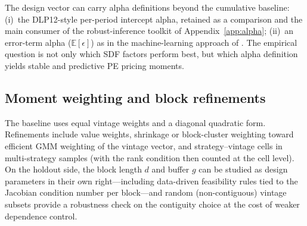 \documentclass[11pt]{article}
\begin{document}
The design vector can carry alpha definitions beyond the cumulative baseline: (i)~the DLP12-style per-period intercept alpha, retained as a comparison and the main consumer of the robust-inference toolkit of Appendix~\ref{app:alpha}; (ii)~an error-term alpha (\(\mathbb E[\epsilon]\)) as in the machine-learning approach of \citet{TauschPietz2024}. The empirical question is not only which SDF factors perform best, but which alpha definition yields stable and predictive PE pricing moments.

\subsection{Moment weighting and block refinements}
\label{app:weighting}

The baseline uses equal vintage weights and a diagonal quadratic form. Refinements include value weights, shrinkage or block-cluster weighting toward efficient GMM weighting of the vintage vector, and strategy--vintage cells in multi-strategy samples (with the rank condition then counted at the cell level). On the holdout side, the block length \(d\) and buffer \(g\) can be studied as design parameters in their own right---including data-driven feasibility rules tied to the Jacobian condition number per block---and random (non-contiguous) vintage subsets provide a robustness check on the contiguity choice at the cost of weaker dependence control.



\end{document}
